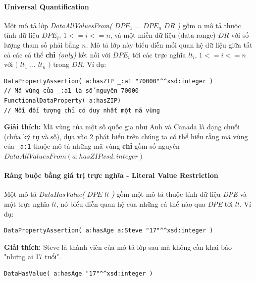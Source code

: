 \paragraph{Universal Quantification} Một mô tả lớp \textit{DataAllValuesFrom(} $DPE_{1}$ ... $DPE_{n}$ $DR$ \textit{)} gồm $n$ mô tả thuộc tính dữ liệu $DPE_{i}$, $1<=i<=n$, và một miền dữ liệu (data range) $DR$ với số lượng tham số phải bằng $n$. Mô tả lớp này biểu diễn mối quan hệ dữ liệu giữa tất cả các cá thể \textbf{chỉ} \textit{(only)} kết nối với $DPE_{i}$ tới các trực nghĩa $lt_{i}$, $1<=i<=n$ với $($ $lt_{1}$ ... $lt_{n}$ $)$ trong $DR$. Ví dụ: 
\begin{verbatim}
DataPropertyAssertion( a:hasZIP _:a1 "70000"^^xsd:integer ) 
// Mã vùng của _:a1 là số nguyên 70000
FunctionalDataProperty( a:hasZIP) 
// Mỗi đối tượng chỉ có duy nhất một mã vùng
\end{verbatim}
\textbf{Giải thích:} Mã vùng của một số quốc gia như Anh và Canada là dạng chuỗi (chứa ký tự và số), dựa vào 2 phát biểu trên chúng ta có thể hiểu rằng mã vùng của \verb|_a:1| thuộc mô tả những mã vùng \textbf{chỉ} gồm số nguyên $DataAllValuesFrom( a:hasZIP xsd:integer )$

\paragraph{Ràng buộc bằng giá trị trực nghĩa - Literal Value Restriction}
Một mô tả \textit{DataHasValue(} $DPE$ $lt$ \textit{)} gồm một mô tả thuộc tính dữ liệu \textit{DPE} và một trực nghĩa $lt$, nó biểu diễn quan hệ của những cá thể nào qua \textit{DPE} tới $lt$. Ví dụ:
\begin{verbatim}
DataPropertyAssertion( a:hasAge a:Steve "17"^^xsd:integer )
\end{verbatim}
\textbf{Giải thích:} Steve là thành viên của mô tả lớp sau mà không cần khai báo "những ai 17 tuổi".
\begin{verbatim}
DataHasValue( a:hasAge "17"^^xsd:integer )
\end{verbatim}

